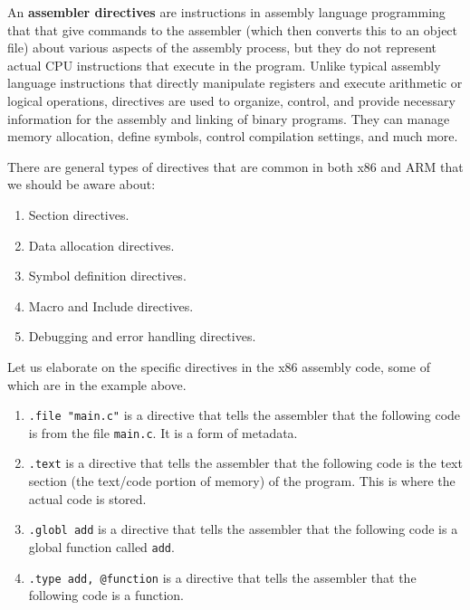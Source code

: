 \documentclass{article}
\begin{document}
    \begin{definition}
      An \textbf{assembler directives} are instructions in assembly language programming that that give commands to the assembler (which then converts this to an object file) about various aspects of the assembly process, but they do not represent actual CPU instructions that execute in the program. Unlike typical assembly language instructions that directly manipulate registers and execute arithmetic or logical operations, directives are used to organize, control, and provide necessary information for the assembly and linking of binary programs. They can manage memory allocation, define symbols, control compilation settings, and much more. 

      There are general types of directives that are common in both x86 and ARM that we should be aware about: 
      \begin{enumerate}
        \item Section directives. 
        \item Data allocation directives. 
        \item Symbol definition directives. 
        \item Macro and Include directives. 
        \item Debugging and error handling directives. 
      \end{enumerate}
    \end{definition}

    \begin{example}
      Let us elaborate on the specific directives in the x86 assembly code, some of which are in the example above. 
      \begin{enumerate}
        \item \texttt{.file "main.c"} is a directive that tells the assembler that the following code is from the file \texttt{main.c}. It is a form of metadata. 
        \item \texttt{.text} is a directive that tells the assembler that the following code is the text section (the text/code portion of memory) of the program. This is where the actual code is stored. 
        \item \texttt{.globl add} is a directive that tells the assembler that the following code is a global function called \texttt{add}.
        \item \texttt{.type add, @function} is a directive that tells the assembler that the following code is a function.
      \end{enumerate}
    \end{example}
\end{document}

